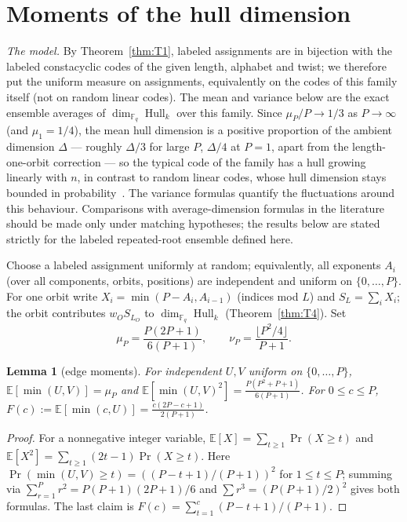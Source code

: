 \documentclass[10pt,journal,draftclsnofoot,onecolumn]{IEEEtran}
\newtheorem{lemma}[theorem]{Lemma}
\theoremstyle{definition}
\theoremstyle{remark}
\newcommand{\Fq}{\mathbb{F}_q}
\newcommand{\Hull}{\operatorname{Hull}}
\newcommand{\E}{\mathbb{E}}
\begin{document}
\section{Moments of the hull dimension}\label{sec:moments}

\emph{The model.} By Theorem~\ref{thm:T1}, labeled assignments are in
bijection with the labeled constacyclic codes of the given length,
alphabet and twist; we therefore put the uniform measure on assignments,
equivalently on the codes of this family itself (not on random linear
codes). The mean and variance below are the exact ensemble averages of
\(\dim_{\Fq}\Hull_k\) over this family. Since
\(\mu_P / P \to 1/3\) as \(P \to \infty\) (and \(\mu_1 = 1/4\)), the mean
hull dimension is a positive proportion of the ambient dimension
\(\Delta\) --- roughly \(\Delta/3\) for large \(P\), \(\Delta/4\) at
\(P = 1\), apart from the length-one-orbit correction --- so the typical
code of the family has a hull growing linearly with \(n\), in contrast
to random linear codes, whose hull dimension stays bounded in
probability~\cite{Sendrier1997}. The variance formulas quantify the
fluctuations around this behaviour. Comparisons with average-dimension formulas in the literature
should be made only under matching hypotheses; the results below are
stated strictly for the labeled repeated-root ensemble defined here.

Choose a labeled assignment uniformly at random; equivalently, all
exponents \(A_i\) (over all components, orbits, positions) are
independent and uniform on \(\{0,\dots,P\}\). For one orbit write
\(X_i = \min(P-A_i, A_{i-1})\) (indices mod \(L\)) and
\(S_L = \sum_i X_i\); the orbit contributes \(w_O S_{L_O}\) to
\(\dim_{\Fq}\Hull_k\) (Theorem~\ref{thm:T4}). Set
\[
\mu_P = \frac{P(2P+1)}{6(P+1)},
\qquad
\nu_P = \frac{\lfloor P^2/4 \rfloor}{P+1}.
\]

\begin{lemma}[edge moments]\label{lem:edge}
For independent \(U, V\) uniform on \(\{0,\dots,P\}\),
\(\E[\min(U,V)] = \mu_P\) and
\(\E[\min(U,V)^2] = \frac{P(P^2+P+1)}{6(P+1)}\).
For \(0 \le c \le P\), \(F(c) := \E[\min(c,U)] =
\frac{c(2P-c+1)}{2(P+1)}\).
\end{lemma}

\begin{proof}
For a nonnegative integer variable,
\(\E[X] = \sum_{t\ge1} \Pr(X \ge t)\) and
\(\E[X^2] = \sum_{t\ge1} (2t-1)\Pr(X\ge t)\).
Here \(\Pr(\min(U,V) \ge t) = ((P-t+1)/(P+1))^2\) for \(1 \le t \le P\);
summing via \(\sum_{r=1}^P r^2 = P(P+1)(2P+1)/6\) and
\(\sum r^3 = (P(P+1)/2)^2\) gives both formulas. The last claim is
\(F(c) = \sum_{t=1}^c (P-t+1)/(P+1)\).
\end{proof}
\end{document}
